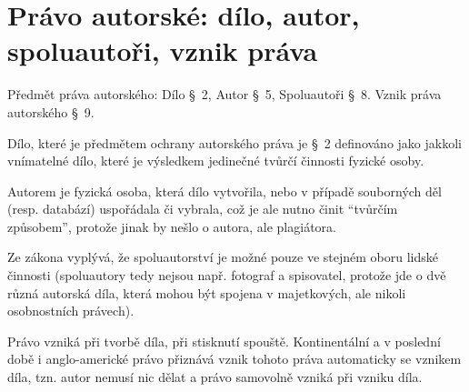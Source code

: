 \section{Právo autorské: dílo, autor, spoluautoři, vznik práva}
Předmět práva autorského: Dílo §~2, Autor §~5, Spoluautoři §~8. Vznik práva autorského §~9.

Dílo, které je předmětem ochrany autorského práva je §~2 definováno jako jakkoli vnímatelné dílo, které je 
výsledkem jedinečné tvůrčí činnosti fyzické osoby.

Autorem je fyzická osoba, která dílo vytvořila, nebo v případě souborných děl (resp. databází) uspořádala či vybrala, 
což je ale nutno činit \enquote{tvůrčím způsobem}, protože jinak by nešlo o autora, ale plagiátora.

Ze zákona vyplývá, že spoluautorství je možné pouze ve stejném oboru lidské činnosti (spoluautory tedy nejsou např. 
fotograf a spisovatel, protože jde o dvě různá autorská díla, která mohou být spojena v majetkových, ale nikoli 
osobnostních právech).

Právo vzniká při tvorbě díla, při stisknutí spouště. Kontinentální a v poslední době i anglo-americké právo přiznává 
vznik tohoto práva automaticky se vznikem díla, tzn. autor nemusí nic dělat a právo samovolně vzniká při vzniku díla.